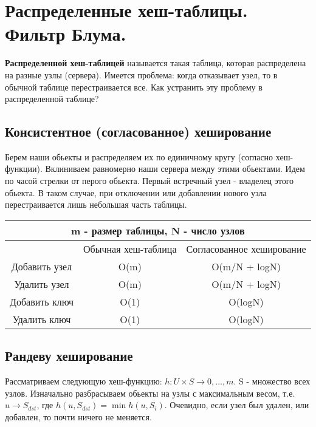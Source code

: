 \section{Распределенные хеш-таблицы. Фильтр Блума.}
 

 {\bf Распределенной хеш-таблицей} называется такая таблица, которая распределена на разные узлы (сервера).
 Имеется проблема: когда отказывает узел, то в обычной таблице перестраивается все. Как устранить эту проблему в распределенной таблице?

\subsection {Консистентное (согласованное) хеширование}
Берем наши обьекты и распределяем их по единичному кругу (согласно хеш-функции). Вклиниваем равномерно наши сервера между этими обьектами. Идем по часой стрелки от перого обьекта. Первый встречный узел - владелец этого обьекта. В таком случае, при отключении или добавлении нового узла перестраивается лишь небольшая часть таблицы. 

\begin{table}[]
\begin{tabular}{|c|c|c|}
\hline
\multicolumn{3}{|c|}{m - размер таблицы, N - число узлов}       \\ \hline
              & Обычная хеш-таблица & Согласованное хеширование \\ \hline
Добавить узел & O(m)                & O(m/N + logN)             \\ \hline
Удалить узел  & O(m)                & O(m/N + logN)             \\ \hline
Добавить ключ & O(1)                & O(logN)                   \\ \hline
Удалить ключ  & O(1)                & O(logN)                   \\ \hline
\end{tabular}
\end{table}

\subsection {Рандеву хеширование}
Рассматриваем следующую хеш-функцию: $h: U \times S \rightarrow {0, ..., m}$. S - множество всех узлов. Изначально разбрасываем обьекты на узлы с максимальным весом, т.е. 
$u \rightarrow S_{dst}$, где $h(u, S_{dst}) = \min h(u, S_i)$. Очевидно, если узел был удален, или добавлен, то почти ничего не меняется.


